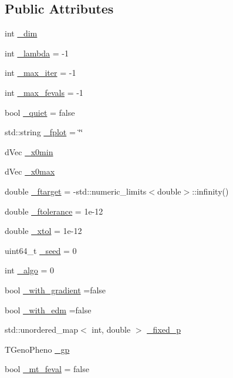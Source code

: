 \subsection*{Public Attributes}
\begin{DoxyCompactItemize}
\item 
int \hyperlink{classlibcmaes_1_1Parameters_affc62ae5c5f1db4f88e4c2dc96387af6}{\-\_\-dim}
\item 
int \hyperlink{classlibcmaes_1_1Parameters_af732f7206f23cbd6ec2bbd4e217a9a2b}{\-\_\-lambda} = -\/1
\item 
int \hyperlink{classlibcmaes_1_1Parameters_a60abfc730c5aa46e42ebd1598b59caa6}{\-\_\-max\-\_\-iter} = -\/1
\item 
int \hyperlink{classlibcmaes_1_1Parameters_ad316488121bd51f62b28e8183d591c9e}{\-\_\-max\-\_\-fevals} = -\/1
\item 
bool \hyperlink{classlibcmaes_1_1Parameters_a6f6dad55c02a23891e3280cad288295a}{\-\_\-quiet} = false
\item 
std\-::string \hyperlink{classlibcmaes_1_1Parameters_aa49511ea00199348ea94f1aa53fe5bc1}{\-\_\-fplot} = \char`\"{}\char`\"{}
\item 
d\-Vec \hyperlink{classlibcmaes_1_1Parameters_aa3bb27467698d9cb7fc7e0a83b48800f}{\-\_\-x0min}
\item 
d\-Vec \hyperlink{classlibcmaes_1_1Parameters_aece9694af9bee78bb13b0994db7ac45e}{\-\_\-x0max}
\item 
double \hyperlink{classlibcmaes_1_1Parameters_a837dbcfba351a043441076a11666f92c}{\-\_\-ftarget} = -\/std\-::numeric\-\_\-limits$<$double$>$\-::infinity()
\item 
double \hyperlink{classlibcmaes_1_1Parameters_ab6c11cc112b5709e9039967e881c808e}{\-\_\-ftolerance} = 1e-\/12
\item 
double \hyperlink{classlibcmaes_1_1Parameters_aaa9e8eedba7d7140d116163b40f653f8}{\-\_\-xtol} = 1e-\/12
\item 
uint64\-\_\-t \hyperlink{classlibcmaes_1_1Parameters_ac6d616c3d5295fec8a0b230592fb767a}{\-\_\-seed} = 0
\item 
int \hyperlink{classlibcmaes_1_1Parameters_a7a5fc681b0c7294ef050ace344f923db}{\-\_\-algo} = 0
\item 
bool \hyperlink{classlibcmaes_1_1Parameters_aff76cebbfef51c20398aab8f49a3676a}{\-\_\-with\-\_\-gradient} =false
\item 
bool \hyperlink{classlibcmaes_1_1Parameters_adbaa11317ae66061e097c372522b8758}{\-\_\-with\-\_\-edm} =false
\item 
std\-::unordered\-\_\-map$<$ int, double $>$ \hyperlink{classlibcmaes_1_1Parameters_a83fdae9d4bb9b77c8ad955c6aac75086}{\-\_\-fixed\-\_\-p}
\item 
T\-Geno\-Pheno \hyperlink{classlibcmaes_1_1Parameters_ab8e153b4785de9358599caa840b94ef2}{\-\_\-gp}
\item 
bool \hyperlink{classlibcmaes_1_1Parameters_a78a3b97b4119776b661c1be4fc283069}{\-\_\-mt\-\_\-feval} = false
\end{DoxyCompactItemize}

